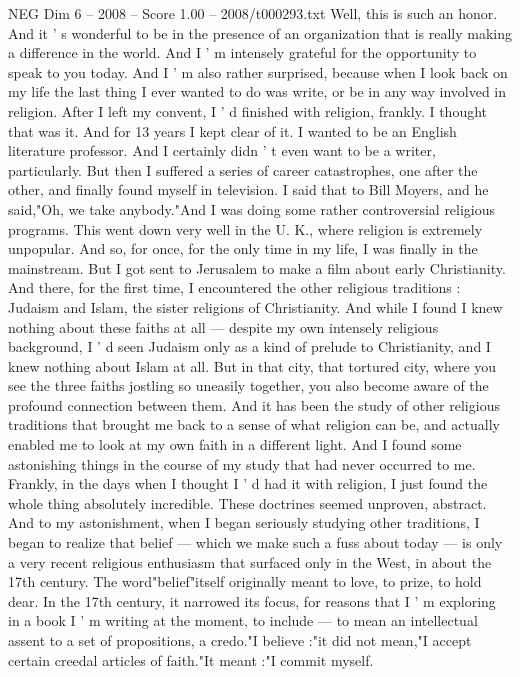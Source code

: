\begin{textsample}{NEG Dim 6 – 2008 – Score 1.00 – 2008/t000293.txt}  \label{ex:f6_neg_067}
Well, this is such an honor.
And it ' s wonderful to be in the presence of an organization that is really making a difference in the world.
And I ' m intensely grateful for the opportunity to speak to you today.
And I ' m also rather surprised, because when I look back on my life the last thing I ever wanted to do was write, or be in any way involved in religion.
After I left my convent, I ' d finished with religion, frankly.
I thought that was it.
And for 13 years I kept clear of it.
I wanted to be an English literature professor.
And I certainly didn ' t even want to be a writer, particularly.
But then I suffered a series of career catastrophes, one after the other, and finally found myself in television.
I said that to Bill Moyers, and he said,"Oh, we take anybody."And I was doing some rather controversial religious programs.
This went down very well in the U.
K., where religion is extremely unpopular.
And so, for once, for the only time in my life, I was finally in the mainstream.
But I got sent to Jerusalem to make a film about early Christianity.
And there, for the first time, I encountered the other religious traditions : Judaism and Islam, the sister religions of Christianity.
And while I found I knew nothing about these faiths at all — despite my own intensely religious background, I ' d seen Judaism only as a kind of prelude to Christianity, and I knew nothing about Islam at all.
But in that city, that tortured city, where you see the three faiths jostling so uneasily together, you also become aware of the profound connection between them.
And it has been the study of other religious traditions that brought me back to a sense of what religion can be, and actually enabled me to look at my own faith in a different light.
And I found some astonishing things in the course of my study that had never occurred to me.
Frankly, in the days when I thought I ' d had it with religion, I just found the whole thing absolutely incredible.
These doctrines seemed unproven, abstract.
And to my astonishment, when I began seriously studying other traditions, I began to realize that belief — which we make such a fuss about today — is only a very recent religious enthusiasm that surfaced only in the West, in about the 17th century.
The word"belief"itself originally meant to love, to prize, to hold dear.
In the 17th century, it narrowed its focus, for reasons that I ' m exploring in a book I ' m writing at the moment, to include — to mean an intellectual assent to a set of propositions, a credo."I believe :"it did not mean,"I accept certain creedal articles of faith."It meant :"I commit myself.

\end{textsample}
